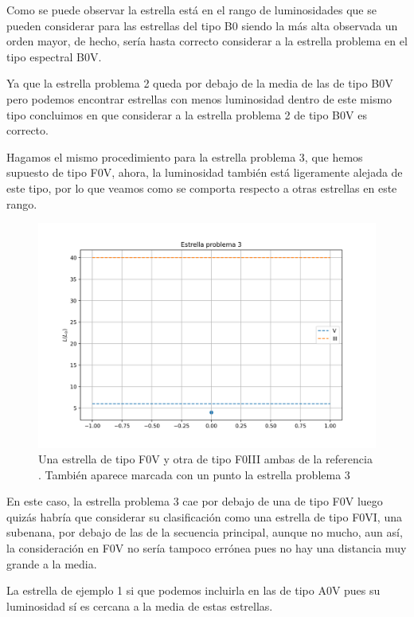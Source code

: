 \documentclass{aa} %
\begin{document}
Como se puede observar la estrella está en el rango de luminosidades que se pueden considerar para las estrellas del tipo B0 siendo la más alta observada un orden mayor, de hecho, sería hasta correcto considerar a la estrella problema en el tipo espectral B0V.

Ya que la estrella problema 2 queda por debajo de la media de las de tipo B0V pero podemos encontrar estrellas con menos luminosidad dentro de este mismo tipo concluimos en que considerar a la estrella problema 2 de tipo B0V es correcto.

Hagamos el mismo procedimiento para la estrella problema 3, que hemos supuesto de tipo F0V, ahora, la luminosidad también está ligeramente alejada de este tipo, por lo que veamos como se comporta respecto a otras estrellas en este rango.

\begin{figure}[h!]
\begin{center}
\includegraphics[scale=0.35]{TipoF.png}
\caption{Una estrella de tipo F0V y otra de tipo F0III ambas de la referencia \cite{CiteDrive2022}. También aparece marcada con un punto la estrella problema 3}
\label{fig:problema3}
\end{center}
\end{figure}

En este caso, la estrella problema 3 cae por debajo de una de tipo F0V luego quizás habría que considerar su clasificación como una estrella de tipo F0VI, una subenana, por debajo de las de la secuencia principal, aunque no mucho, aun así, la consideración en F0V no sería tampoco errónea pues no hay una distancia muy grande a la media.

La estrella de ejemplo 1 si que podemos incluirla en las de tipo A0V pues su luminosidad sí es cercana a la media de estas estrellas.
\end{document}

